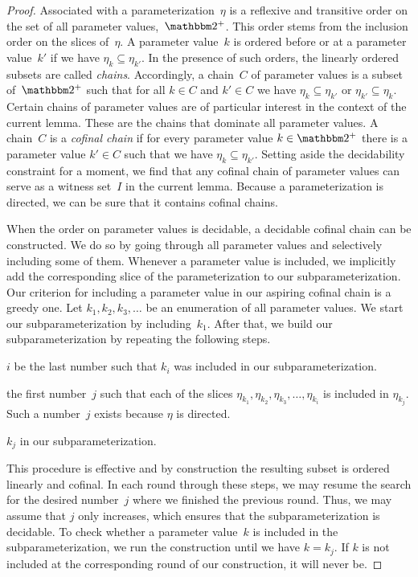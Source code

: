 \begin{proof}
  Associated with a parameterization~$\eta$ is a reflexive and transitive order on the set of all parameter values,~$\binary^+$.
  This order stems from the inclusion order on the slices of~$\eta$.
  A parameter value~$k$ is ordered before or at a parameter value~$k'$ if we have $\eta_k \subseteq \eta_{k'}$.
  In the presence of such orders, the linearly ordered subsets are called \emph{chains}.
  Accordingly, a chain~$C$ of parameter values is a subset of~$\binary^+$ such that for all $k \in C$ and $k' \in C$ we have $\eta_k \subseteq \eta_{k'}$ or $\eta_{k'} \subseteq \eta_k$.
  Certain chains of parameter values are of particular interest in the context of the current lemma.
  These are the chains that dominate all parameter values.
  A chain~$C$ is a \emph{cofinal chain} \parencite{abramsky1994domain} if for every parameter value $k \in \binary^+$ there is a parameter value $k' \in C$ such that we have $\eta_{k} \subseteq \eta_{k'}$.
  Setting aside the decidability constraint for a moment, we find that any cofinal chain of parameter values can serve as a witness set~$I$ in the current lemma.
  Because a parameterization is directed, we can be sure that it contains cofinal chains.

  When the order on parameter values is decidable, a decidable cofinal chain can be constructed.
  We do so by going through all parameter values and selectively including some of them.
  Whenever a parameter value is included, we implicitly add the corresponding slice of the parameterization to our subparameterization.
  Our criterion for including a parameter value in our aspiring cofinal chain is a greedy one.
  Let $k_1, k_2, k_3, \ldots$ be an enumeration of all parameter values.
  We start our subparameterization by including~$k_1$.
  After that, we build our subparameterization by repeating the following steps.
  \begin{codelisting}
  \item
     $i$ be the last number such that $k_i$ was included in our subparameterization.
  \item
     the first number~$j$ such that each of the slices $\eta_{k_1}, \eta_{k_2}, \eta_{k_3}, \ldots, \eta_{k_i}$ is included in $\eta_{k_j}$.
    Such a number~$j$ exists because $\eta$ is directed.
  \item
     $k_j$ in our subparameterization.
  \end{codelisting}
  This procedure is effective and by construction the resulting subset is ordered linearly and cofinal.
  In each round through these steps, we may resume the search for the desired number~$j$ where we finished the previous round.
  Thus, we may assume that $j$ only increases, which ensures that the subparameterization is decidable.
  To check whether a parameter value~$k$ is included in the subparameterization, we run the construction until we have $k = k_j$.
  If $k$ is not included at the corresponding round of our construction, it will never be.
\end{proof}

